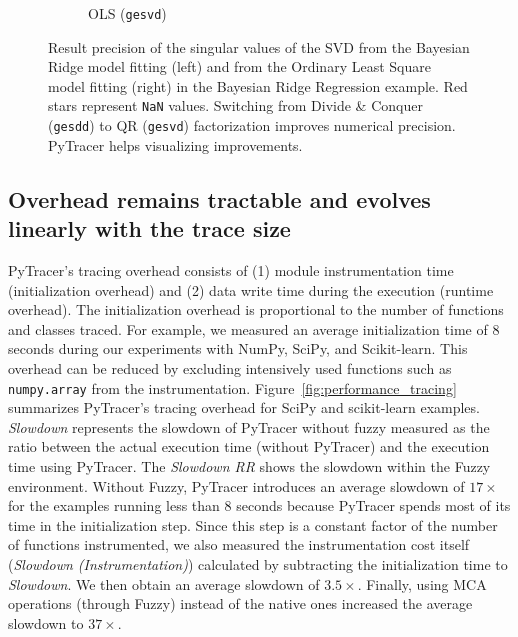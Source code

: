 \documentclass[10pt,journal,compsoc]{IEEEtran}
\newcommand{\pytracer}[0]{PyTracer\xspace}
\DeclareRobustCommand{\add}[1]{\textcolor{ao(english)}{#1}}%
\DeclareRobustCommand{\remove}[1]{}
\DeclareRobustCommand{\add}[1]{#1}
\DeclareRobustCommand{\remove}[1]{}
\begin{document}
\begin{figure}
\begin{subfigure}{0.49\linewidth}
        \caption{OLS (\texttt{gesvd})}
        \label{fig:OLS_svd_fixed}
    \end{subfigure}
    \caption{\add{Result} precision of the singular values of the SVD from the
        Bayesian Ridge model fitting (left) and from the Ordinary Least Square model
        fitting (right) in the Bayesian Ridge Regression example. Red stars
        represent \texttt{NaN} values. 
        Switching from Divide \& Conquer (\texttt{gesdd}) to QR (\texttt{gesvd}) factorization improves numerical precision.
        PyTracer helps visualizing improvements.}
\end{figure}

\subsection{Overhead remains tractable and evolves linearly with the trace size}

\pytracer's tracing overhead consists of (1) module instrumentation time
(initialization overhead) and (2) data write time during the execution (runtime
overhead). The initialization overhead is proportional to the number of
functions and classes traced. For example, we measured an average initialization
time of 8 seconds during our experiments with  NumPy, SciPy, and Scikit-learn.
This overhead can be reduced by excluding intensively used functions such as
\texttt{numpy.array} from the instrumentation.
Figure~\ref{fig:performance_tracing} summarizes \pytracer's tracing overhead for
SciPy and scikit-learn examples. \textit{Slowdown} represents the slowdown of
\pytracer without fuzzy measured as the ratio between the actual execution time
(without \pytracer) and the execution time using \pytracer. The \textit{Slowdown
    RR} \remove{and \textit{Slowdown MCA}} shows the slowdown within the Fuzzy environment.
Without Fuzzy, \pytracer introduces an average slowdown of $17\times$ for
the examples running less than 8 seconds because \pytracer spends most of its
time in the initialization step. Since this step is a constant factor of the
number of functions instrumented, we also measured the instrumentation cost
itself (\textit{Slowdown (Instrumentation)}) calculated by subtracting the
initialization time to \textit{Slowdown}. We then obtain an average slowdown of
$3.5\times$. Finally, \remove{the Fuzzy instrumentation} \add{using MCA
    operations (through Fuzzy) instead of the native ones} increased the average
slowdown to $37\times$\remove{for RR and $43\times$ for Full MCA}.
\end{document}
